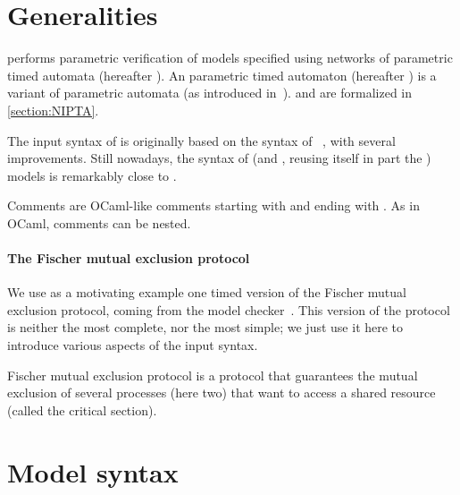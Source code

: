 \section{Generalities}
\imitator{} performs parametric verification of models specified using networks of \imitator{} parametric timed automata (hereafter \NIPTA{}).
An \imitator{} parametric timed automaton (hereafter \IPTA{}) is a variant of parametric automata (as introduced in~\cite{AHV93}).
\IPTA{} and \NIPTA{} are formalized in \cref{section:NIPTA}.

The input syntax of \imitator{} is originally based on the syntax of \hytech{}~\cite{HHW95}, with several improvements.
%
Still nowadays, the syntax of \hytech{} (and \phaverLite{}, reusing itself in part the \hytech{}) models is remarkably close to \imitator{}.

Comments are OCaml-like comments starting with \styleIMI{(*} and ending with \styleIMI{*)}.
As in OCaml, comments can be nested.


\paragraph{The Fischer mutual exclusion protocol}
We use as a motivating example one timed version of the Fischer mutual exclusion protocol, coming from the \pat{} model checker~\cite{SLDP09}.
This version of the protocol is neither the most complete, nor the most simple; we just use it here to introduce various aspects of the \imitator{} input syntax.

Fischer mutual exclusion protocol is a protocol that guarantees the mutual exclusion of several processes (here two) that want to access a shared resource (called the critical section).
%

\section{Model syntax}

